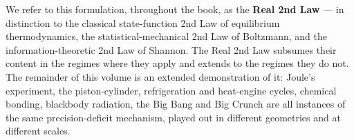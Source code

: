 We refer to this formulation, throughout the book, as the
\textbf{Real 2nd Law} --- in distinction to the classical
state-function 2nd Law of equilibrium thermodynamics, the
statistical-mechanical 2nd Law of Boltzmann, and the
information-theoretic 2nd Law of Shannon. The Real 2nd Law
subsumes their content in the regimes where they apply and
extends to the regimes they do not. The remainder of this volume is
an extended demonstration of it: Joule's experiment, the
piston-cylinder, refrigeration and heat-engine cycles, chemical
bonding, blackbody radiation, the Big Bang and Big Crunch are all
instances of the same precision-deficit mechanism, played out in
different geometries and at different scales.
